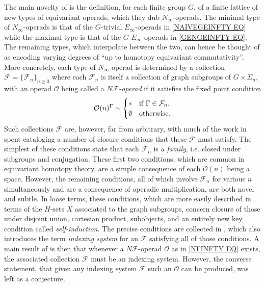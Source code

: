 \documentclass[a4paper,10pt
,draft
]{article}%
\numberwithin{equation}{section}
\numberwithin{figure}{section}
\theoremstyle{definition} %
\newcommand{\set}[1]{\left\{#1\right\}}%
\renewcommand{\O}{\ensuremath{\mathcal O}}
\newcommand{\1}{\ensuremath{\mathbbm 1}}%
\begin{document}
The main novelty of \cite{BH15} is the definition, for each finite group $G$, of a finite lattice of new types of equivariant operads, which they dub $N_{\infty}$-operads.
The minimal type of $N_{\infty}$-operads is that of the 
$G$-trivial $E_{\infty}$-operads in \eqref{NAIVEGEINFTY EQ} 
while the maximal type is that of the $G$-$E_{\infty}$-operads in \eqref{GENGEINFTY EQ}.
The remaining types, which interpolate between 
the two,
can hence be thought of as encoding varying degrees of ``up to homotopy equivariant commutativity''.
More concretely, each type of $N_{\infty}$-operad is determined by a collection
$\mathcal{F} = \{\mathcal{F}_n\}_{n \geq 0}$
\index{F@$\mathcal F = \set{\mathcal F_n}_{n \geq 0}$}
where each $\mathcal{F}_n$ is itself a collection of graph subgroups of $G \times \Sigma_n$,
with an operad $\O$ being called a
\textit{$N \mathcal{F}$-operad} if it satisfies the fixed point condition
\begin{equation}\label{NFINFTY EQ}
	\O(n)^{\Gamma} \sim 
\begin{cases}
	\** & \text{if } \Gamma \in \mathcal{F}_n,
\\
	\emptyset & \text{otherwise}.
\end{cases}
\end{equation}
Such collections $\mathcal{F}$ are, however, far from arbitrary, with much of the work in \cite[\S 3]{BH15} spent cataloging a number of closure conditions that these $\mathcal{F}$ must satisfy.
The simplest of these conditions
state that each $\mathcal{F}_n$ is a \textit{family}, i.e. closed under subgroups and conjugation. These first two conditions, which are common in equivariant homotopy theory,
are a simple consequence of each $\O(n)$ being a space.
However, the remaining conditions, 
all of which involve $\mathcal{F}_n$ for various $n$ simultaneously and are a consequence of operadic multiplication,
are both novel and subtle.
In loose terms, these conditions, 
which are more easily described in terms of the 
$H$-sets $X$ associated to the graph subgroups,
concern closure of those under 
disjoint union, cartesian product, subobjects,
and an entirely new key condition called \textit{self-induction}.
The precise conditions are collected in
\cite[Def. 3.22]{BH15},
which also introduces the term \textit{indexing system} for 
an $\mathcal{F}$ satisfying all of those conditions.
A main result of \cite[\S 4]{BH15} is then that whenever a $N\mathcal F$-operad $\O$ as in \eqref{NFINFTY EQ} exists,
the associated collection $\mathcal{F}$ must be an indexing system.
However, the converse statement, that given any indexing system $\mathcal{F}$ such an $\O$ can be produced, was left as a conjecture.
\end{document}
